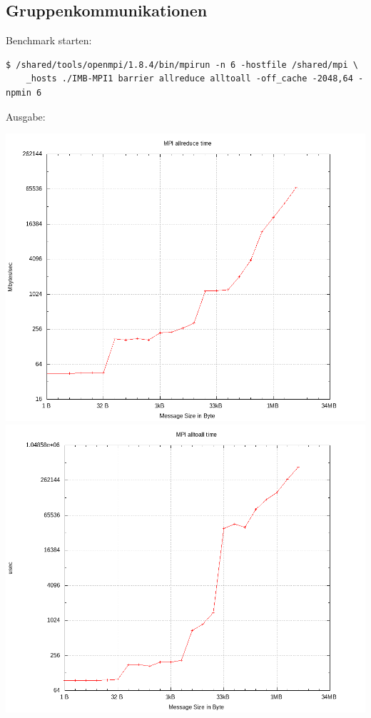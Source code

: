 \subsection{Gruppenkommunikationen}
Benchmark starten:
\begin{lstlisting}[style=Bash]
$ /shared/tools/openmpi/1.8.4/bin/mpirun -n 6 -hostfile /shared/mpi \
    _hosts ./IMB-MPI1 barrier allreduce alltoall -off_cache -2048,64 -npmin 6
\end{lstlisting}
Ausgabe:

\includegraphics[scale=0.6]{../mpi_benchmark/allreduce_time.png}
\newline
\includegraphics[scale=0.6]{../mpi_benchmark/alltoall_time.png}
